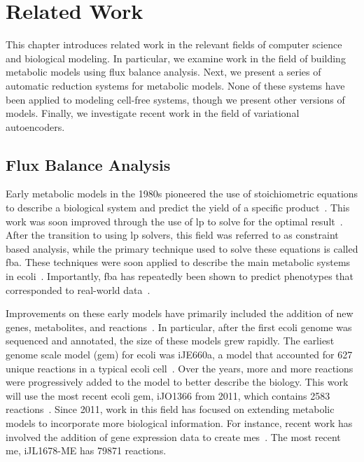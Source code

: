 \chapter{Related Work} \label{chap:rw}
This chapter introduces related work in the relevant fields of computer science and biological modeling.
In particular, we examine work in the field of building metabolic models using flux balance analysis.
Next, we present a series of automatic reduction systems for metabolic models.
None of these systems have been applied to modeling cell-free systems, though we present other versions of models.
Finally, we investigate recent work in the field of variational autoencoders.


\section{Flux Balance Analysis}
Early metabolic models in the 1980s pioneered the use of stoichiometric equations to describe a biological system and predict the yield of a specific product~\cite{papoutsakis1984equations}.
This work was soon improved through the use of \gls{lp} to solve for the optimal result~\cite{fell1986fat}.
After the transition to using \gls{lp} solvers, this field was referred to as constraint based analysis, while the primary technique used to solve these equations is called \gls{fba}.
These techniques were soon applied to describe the main metabolic systems in \gls{ecoli}~\cite{majewski1990simple}.
Importantly, \gls{fba} has repeatedly been shown to predict phenotypes that corresponded to real-world data~\cite{varma1994stoichiometric, edwards2001silico, segre2002analysis, bordbar2014constraint}.

Improvements on these early models have primarily included the addition of new genes, metabolites, and reactions~\cite{varma1993metabolic}.
In particular, after the first \gls{ecoli} genome was sequenced and annotated, the size of these models grew rapidly.
The earliest genome scale model (\gls{gem}) for \gls{ecoli} was iJE660a, a model that accounted for 627 unique reactions in a typical \gls{ecoli} cell~\cite{edwards2000escherichia}.
Over the years, more and more reactions were progressively added to the model to better describe the biology.
This work will use the most recent \gls{ecoli} \gls{gem}, iJO1366 from 2011, which contains 2583 reactions~\cite{orth2011comprehensive}.
Since 2011, work in this field has focused on extending metabolic models to incorporate more biological information.
For instance, recent work has involved the addition of gene expression data to create \glspl{me}~\cite{lloyd2017cobrame}.
The most recent \gls{me}, iJL1678-ME has 79871 reactions.

